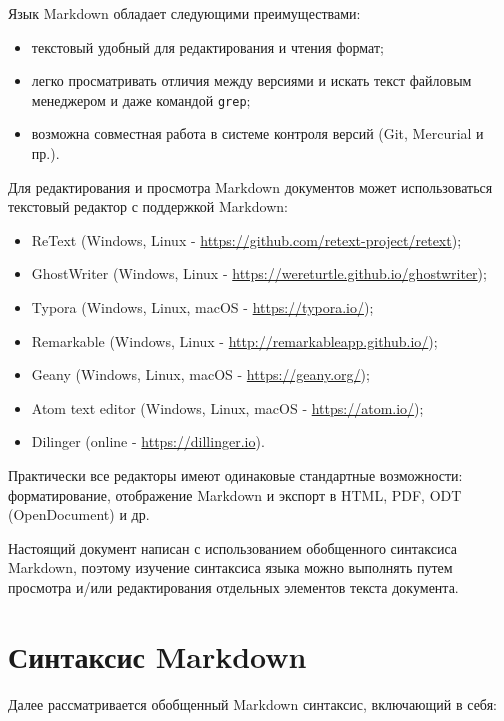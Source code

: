 \documentclass[
  a4paper,
]{book}
\providecommand{\tightlist}{%
  \setlength{\itemsep}{0pt}\setlength{\parskip}{0pt}}
\theoremstyle{definition}
\theoremstyle{definition}
\theoremstyle{definition}
\theoremstyle{definition}
\theoremstyle{remark}
\begin{document}
Язык Markdown обладает следующими преимуществами:

\begin{itemize}
\tightlist
\item
  текстовый удобный для редактирования и чтения формат;
\item
  легко просматривать отличия между версиями и искать текст файловым менеджером и даже командой \texttt{grep};
\item
  возможна совместная работа в системе контроля версий (Git, Mercurial и пр.).
\end{itemize}

Для редактирования и просмотра Markdown документов может использоваться текстовый редактор с поддержкой Markdown:

\begin{itemize}
\tightlist
\item
  ReText (Windows, Linux - \url{https://github.com/retext-project/retext});
\item
  GhostWriter (Windows, Linux - \url{https://wereturtle.github.io/ghostwriter});
\item
  Typora (Windows, Linux, macOS - \url{https://typora.io/});
\item
  Remarkable (Windows, Linux - \url{http://remarkableapp.github.io/});
\item
  Geany (Windows, Linux, macOS - \url{https://geany.org/});
\item
  Atom text editor (Windows, Linux, macOS - \url{https://atom.io/});
\item
  Dilinger (online - \url{https://dillinger.io}).
\end{itemize}

Практически все редакторы имеют одинаковые стандартные возможности: форматирование, отображение Markdown и экспорт в HTML, PDF, ODT (OpenDocument) и др.

Настоящий документ написан с использованием обобщенного синтаксиса Markdown, поэтому изучение синтаксиса языка можно выполнять путем просмотра и/или редактирования отдельных элементов текста документа.

\hypertarget{markdown-syntax}{%
\section{Синтаксис Markdown}\label{markdown-syntax}}

Далее рассматривается обобщенный Markdown синтаксис, включающий в себя:
\end{document}
